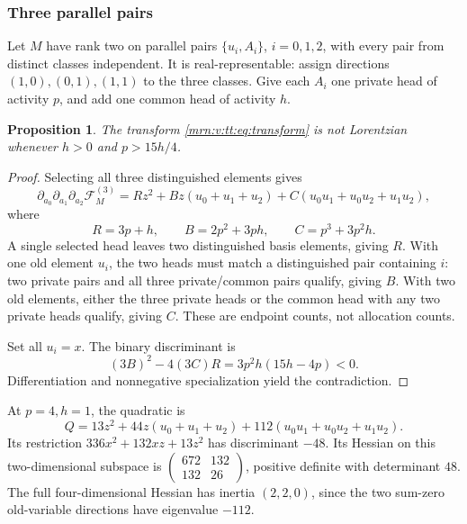 \documentclass[11pt,a4paper]{article}
\newtheorem{proposition}[theorem]{Proposition}
\theoremstyle{remark}\newtheorem{remark}[theorem]{Remark}
\begin{document}
\subsubsection{Three parallel pairs}
Let $M$ have rank two on parallel pairs $\{u_i,A_i\}$, $i=0,1,2$, with every pair from distinct classes independent. It is real-representable: assign directions $(1,0),(0,1),(1,1)$ to the three classes. Give each $A_i$ one private head of activity $p$, and add one common head of activity $h$.
\begin{proposition}\label{mrn:v:tt:prop:abstract}
The transform \eqref{mrn:v:tt:eq:transform} is not Lorentzian whenever $h>0$ and $p>15h/4$.
\end{proposition}
\begin{proof}
Selecting all three distinguished elements gives
\begin{equation}\label{mrn:v:tt:eq:quad}
 \partial_{a_0}\partial_{a_1}\partial_{a_2}\mathcal F_M^{(3)}
 =Rz^2+Bz(u_0+u_1+u_2)+C(u_0u_1+u_0u_2+u_1u_2),
\end{equation}
where
\[
 R=3p+h,\qquad B=2p^2+3ph,\qquad C=p^3+3p^2h.
\]
A single selected head leaves two distinguished basis elements, giving $R$. With one old element $u_i$, the two heads must match a distinguished pair containing $i$: two private pairs and all three private/common pairs qualify, giving $B$. With two old elements, either the three private heads or the common head with any two private heads qualify, giving $C$. These are endpoint counts, not allocation counts.

Set all $u_i=x$. The binary discriminant is
\begin{equation}\label{mrn:v:tt:eq:disc}
 (3B)^2-4(3C)R=3p^2h(15h-4p)<0.
\end{equation}
Differentiation and nonnegative specialization yield the contradiction.
\end{proof}
At $p=4,h=1$, the quadratic is
\begin{equation}\label{mrn:v:tt:eq:smallQ}
 Q=13z^2+44z(u_0+u_1+u_2)+112(u_0u_1+u_0u_2+u_1u_2).
\end{equation}
Its restriction $336x^2+132xz+13z^2$ has discriminant $-48$. Its Hessian on this two-dimensional subspace is $\left(\begin{smallmatrix}672&132\\132&26\end{smallmatrix}\right)$, positive definite with determinant $48$. The full four-dimensional Hessian has inertia $(2,2,0)$, since the two sum-zero old-variable directions have eigenvalue $-112$.
\end{document}
